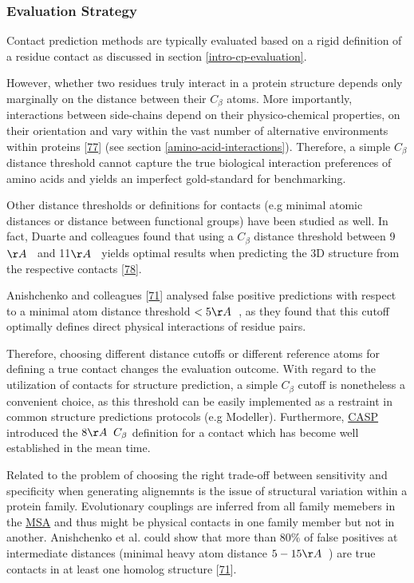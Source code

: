 \documentclass[12pt,a4paper,twoside]{book}
\newcommand{\Cb}{C_\beta}
\theoremstyle{definition}
\theoremstyle{definition}
\theoremstyle{remark}
\begin{document}
\subsubsection*{Evaluation Strategy}\label{evaluation-strategy}

Contact prediction methods are typically evaluated based on a rigid
definition of a residue contact as discussed in section
\ref{intro-cp-evaluation}.

However, whether two residues truly interact in a protein structure
depends only marginally on the distance between their \(\Cb\) atoms.
More importantly, interactions between side-chains depend on their
physico-chemical properties, on their orientation and vary within the
vast number of alternative environments within proteins
{[}\protect\hyperlink{ref-Bettsa}{77}{]} (see section
\ref{amino-acid-interactions}). Therefore, a simple \(\Cb\) distance
threshold cannot capture the true biological interaction preferences of
amino acids and yields an imperfect gold-standard for benchmarking.

Other distance thresholds or definitions for contacts (e.g minimal
atomic distances or distance between functional groups) have been
studied as well. In fact, Duarte and colleagues found that using a
\(\Cb\) distance threshold between 9\(\AA \; \;\) and 11\(\AA \; \;\)
yields optimal results when predicting the 3D structure from the
respective contacts {[}\protect\hyperlink{ref-Duarte2010}{78}{]}.

Anishchenko and colleagues
{[}\protect\hyperlink{ref-Anishchenko2017}{71}{]} analysed false
positive predictions with respect to a minimal atom distance threshold
\(< 5 \AA \; \;\), as they found that this cutoff optimally defines
direct physical interactions of residue pairs.

Therefore, choosing different distance cutoffs or different reference
atoms for defining a true contact changes the evaluation outcome. With
regard to the utilization of contacts for structure prediction, a simple
\(\Cb\) cutoff is nonetheless a convenient choice, as this threshold can
be easily implemented as a restraint in common structure predictions
protocols (e.g Modeller). Furthermore, \protect\hyperlink{abbrev}{CASP}
introduced the \(8\AA \; \; \Cb\) definition for a contact which has
become well established in the mean time.

Related to the problem of choosing the right trade-off between
sensitivity and specificity when generating alignemnts is the issue of
structural variation within a protein family. Evolutionary couplings are
inferred from all family memebers in the \protect\hyperlink{abbrev}{MSA}
and thus might be physical contacts in one family member but not in
another. Anishchenko et al. could show that more than \(80\%\) of false
positives at intermediate distances (minimal heavy atom distance
\(5-15 \AA \;\;\)) are true contacts in at least one homolog structure
{[}\protect\hyperlink{ref-Anishchenko2017}{71}{]}.
\end{document}
